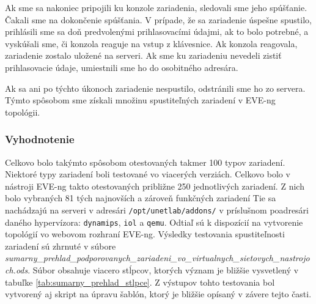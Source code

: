 Ak sme sa nakoniec pripojili ku konzole zariadenia, sledovali sme jeho spúšťanie. Čakali sme na dokončenie spúšťania. V prípade, že sa zariadenie úspešne spustilo, prihlásili sme sa doň predvolenými prihlasovacími údajmi, ak to bolo potrebné, a vyskúšali sme, či konzola reaguje na vstup z klávesnice. Ak konzola reagovala, zariadenie zostalo uložené na serveri. Ak sme ku zariadeniu nevedeli zistiť prihlasovacie údaje, umiestnili sme ho do osobitného adresára.

Ak sa ani po týchto úkonoch zariadenie nespustilo, odstránili sme ho zo servera. Týmto spôsobom sme získali množinu spustiteľných zariadení v EVE-ng topológii.

\subsubsection{Vyhodnotenie}

Celkovo bolo takýmto spôsobom otestovaných takmer 100 typov zariadení. Niektoré typy zariadení boli testované vo viacerých verziách. Celkovo bolo v nástroji EVE-ng takto otestovaných približne 250 jednotlivých zariadení. Z nich bolo vybraných 81 tých najnovších a zároveň funkčných zariadení Tie sa nachádzajú na serveri v adresári \texttt{/opt/unetlab/addons/} v príslušnom poadresári daného hypervízora: \texttt{dynamips}, \texttt{iol} a \texttt{qemu}. Odtiaľ sú k dispozícií na vytvorenie topológií vo webovom rozhraní EVE-ng. Výsledky testovania spustiteľnosti zariadení sú zhrnuté v súbore \\ \emph{sumarny\_prehlad\_podporovanych\_zariadeni\_vo\_virtualnych\_sietovych\_nastrojoch.ods}. Súbor obsahuje viacero stĺpcov, ktorých význam je bližšie vysvetlený v tabuľke \ref{tab:sumarny_prehlad_stlpce}. Z výstupov tohto testovania bol vytvorený aj skript na úpravu šablón, ktorý je bližšie opísaný v závere tejto časti.

